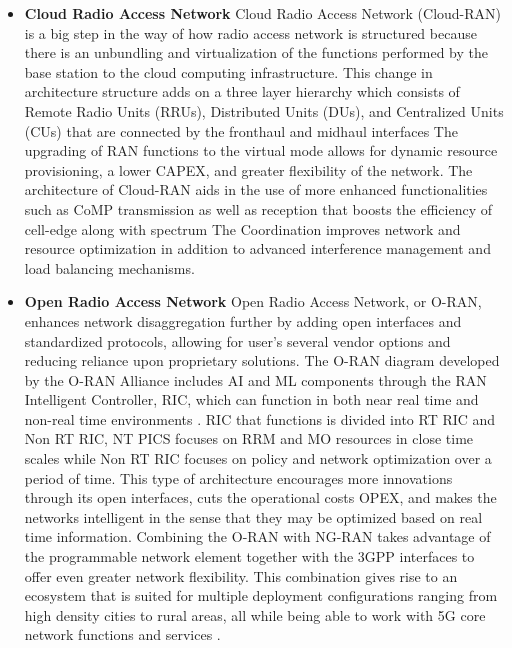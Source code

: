 \documentclass{report}
\begin{document}
\begin{itemize}
    \item \textbf{Cloud Radio Access Network}
    Cloud Radio Access Network (Cloud-RAN) is a big step in the way of how radio access network is structured because there is an unbundling and virtualization of the functions performed by the base station to the cloud computing infrastructure. 
    This change in architecture structure adds on a three layer hierarchy which consists of Remote Radio Units (RRUs), Distributed Units (DUs), and Centralized Units (CUs) that are connected by the fronthaul and midhaul interfaces \cite{check2015cloud} The upgrading of RAN functions to the virtual mode allows for dynamic resource provisioning, a lower CAPEX, and greater flexibility of the network. The architecture of Cloud-RAN aids in the use of more enhanced functionalities such as CoMP transmission as well as reception that boosts the efficiency of cell-edge along with spectrum The Coordination improves network and resource optimization in addition to advanced interference management and load balancing mechanisms.\cite{wu2015}
    
    \item \textbf{Open Radio Access Network}
    Open Radio Access Network, or O-RAN, enhances network disaggregation further by adding open interfaces and standardized protocols, allowing for user’s several vendor options and reducing reliance upon proprietary solutions. The O-RAN diagram developed by the O-RAN Alliance includes AI and ML components through the RAN Intelligent Controller, RIC, which can function in both near real time and non-real time environments \cite{oran_alliance}. RIC that functions is divided into RT RIC and Non RT RIC, NT PICS focuses on RRM and MO resources in close time scales while Non RT RIC focuses on policy and network optimization over a period of time. This type of architecture encourages more innovations through its open interfaces, cuts the operational costs OPEX, and makes the networks intelligent in the sense that they may be optimized based on real time information. Combining the O-RAN with NG-RAN takes advantage of the programmable network element together with the 3GPP interfaces to offer even greater network flexibility. This combination gives rise to an ecosystem that is suited for multiple deployment configurations ranging from high density cities to rural areas, all while being able to work with 5G core network functions and services \cite{gavrilovska2020cloud}.
    
\end{itemize}
\end{document}

